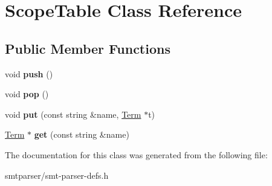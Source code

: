 \hypertarget{classScopeTable}{\section{\-Scope\-Table \-Class \-Reference}
\label{classScopeTable}
}
\subsection*{\-Public \-Member \-Functions}
\begin{DoxyCompactItemize}
\item 
\hypertarget{classScopeTable_a17b3cdf7da3172bd41bece4728ca85a6}{void {\bfseries push} ()}\label{classScopeTable_a17b3cdf7da3172bd41bece4728ca85a6}

\item 
\hypertarget{classScopeTable_aa45f000b7ee2e70d103614942df9e0e4}{void {\bfseries pop} ()}\label{classScopeTable_aa45f000b7ee2e70d103614942df9e0e4}

\item 
\hypertarget{classScopeTable_a3e4786d324e44f4716fc9b45827a9a7e}{void {\bfseries put} (const string \&name, \hyperlink{classTerm}{\-Term} $\ast$t)}\label{classScopeTable_a3e4786d324e44f4716fc9b45827a9a7e}

\item 
\hypertarget{classScopeTable_a597f78e8f195ffefabfbe0e7b258e565}{\hyperlink{classTerm}{\-Term} $\ast$ {\bfseries get} (const string \&name)}\label{classScopeTable_a597f78e8f195ffefabfbe0e7b258e565}

\end{DoxyCompactItemize}


\-The documentation for this class was generated from the following file\-:\begin{DoxyCompactItemize}
\item 
smtparser/smt-\/parser-\/defs.\-h\end{DoxyCompactItemize}
